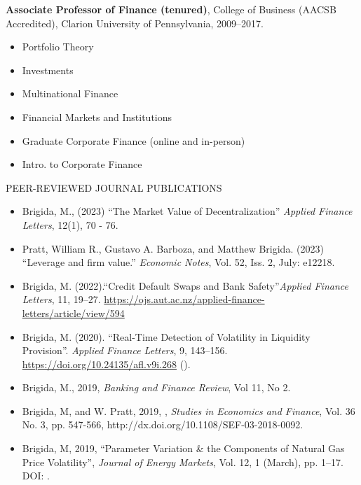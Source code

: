 \documentclass[9pt]{article}
\begin{document}
{\bf Associate Professor of Finance (tenured)}, College of Business (AACSB Accredited), Clarion University of Pennsylvania, 2009--2017.
\begin{itemize}[noitemsep, nolistsep]
\item Portfolio Theory
\item Investments
\item Multinational Finance
\item Financial Markets and Institutions
\item Graduate Corporate Finance (online and in-person)
\item Intro. to Corporate Finance
\end{itemize}
\vspace{10pt}
PEER-REVIEWED JOURNAL PUBLICATIONS
\begin{itemize}[noitemsep, nolistsep]
\item Brigida, M., (2023) ``The Market Value of Decentralization'' {\it Applied Finance Letters}, 12(1), 70 - 76.
\item Pratt, William R., Gustavo A. Barboza, and Matthew Brigida. (2023) ``Leverage and firm value.'' {\it Economic Notes}, Vol. 52, Iss. 2, July: e12218.
\item Brigida, M. (2022).``Credit Default Swaps and Bank Safety''{\it Applied Finance Letters}, 11, 19--27.  \url{https://ojs.aut.ac.nz/applied-finance-letters/article/view/594}
\item Brigida, M. (2020). ``Real-Time Detection of Volatility in Liquidity Provision''. {\it Applied Finance Letters}, 9, 143--156. \url{https://doi.org/10.24135/afl.v9i.268} (\href{https://arxiv.org/abs/2011.10930}{\color{Blue}{arXiv version}}).
\item Brigida, M., 2019, \href{http://www.bankingandfinancereview.com/bfr/index.php/bfr/article/view/1074/180}{\color{Blue}{``The Effect of Bank Regulatory Capital Levels on Loan Types''}}{\it Banking and Finance Review}, Vol 11, No 2.
\item Brigida, M, and W. Pratt, 2019, \href{https://papers.ssrn.com/sol3/papers.cfm?abstract_id=2848527}{\color{Blue}{High-Frequency Trading and the Weekly Natural Gas Storage Report}}, {\it Studies in Economics and Finance}, Vol. 36 No. 3, pp. 547-566, http://dx.doi.org/10.1108/SEF-03-2018-0092.
\item Brigida, M, 2019, ``Parameter Variation \& the Components of Natural Gas Price Volatility'', {\it Journal of Energy Markets}, Vol. 12, 1 (March), pp. 1--17. DOI: \href{https://doi.org/10.21314/JEM.2018.182}{\color{Blue}{10.21314/JEM.2018.182}}.

\end{itemize}
\end{document}
